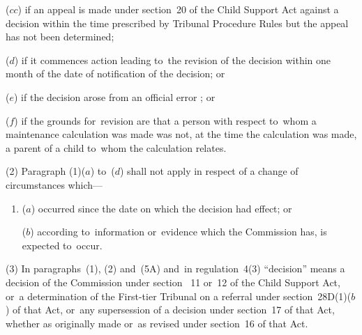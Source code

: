 \documentclass[12pt,a4paper]{article}
\begin{document}
{\begin{enumerate}
($cc$) if an appeal is made under section~20 of the Child Support Act against a decision within the time prescribed 
by Tribunal Procedure Rules  %
but the appeal has not been determined;

($d$) if 
it  %
commences action leading to~the revision of the decision within one month of the date of notification of the decision; or

($e$) if the decision arose from an official error%
%
; or

    ($f$) 
    if the grounds for~revision are that a person with respect to~whom a maintenance calculation was made was not, at the time the calculation was made, a parent of a child to~whom the calculation relates.
\end{enumerate}

(2) Paragraph (1)($a$)  to~($d$)  shall not apply in respect of a change of circumstances which—
\begin{enumerate}\item[]
($a$) occurred since the date on which the decision had effect; or

($b$) according to~information or~evidence which the 
Commission  %
has, is expected to~occur.
\end{enumerate}


(3) In paragraphs~(1), (2) and~(5A) and~in regulation~4(3) “decision” means a decision of the 
Commission  %
under section~%
11 or~12  %
of the Child Support Act, or~a determination of 
the First-tier Tribunal  %
on a referral under section~28D(1)($b$)  of that Act, or~any supersession of a decision under section~17 of that Act, whether as originally made or~as revised under section~16 of that Act.

}
\end{document}
